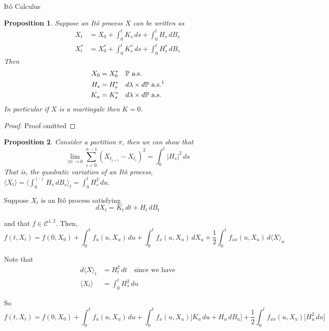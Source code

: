 \documentclass[12pt]{article}
\newenvironment{theorem}[2][Theorem:]{\begin{trivlist} %
\item[\hskip \labelsep {\bfseries #1}\hskip \labelsep {\bfseries #2.}]}{\end{trivlist}}
\newtheorem{proposition}{Proposition}
\begin{document}
\begin{section}{It\^{o} Calculus}
\begin{proposition} Suppose an It\^{o} process $X$ can be written as
	\begin{align*}
		X_t &= X_0 + \int^t_0 K_s\,ds + \int^t_0 H_s\,dB_s \\
		X_t^* &= X_0^* + \int^t_0 K_s^*\,ds + \int^t_0 H_s^*\,dB_s
	\end{align*}
Then
	\begin{align*}
		X_0 &= X_0^* \quad \text{$\mathbb P$ a.s.} \\
		H_s &= H_s^* \quad \text{$d\lambda\times d\mathbb P$ a.s.\footnotemark} \\
		K_u &= K_s^* \quad \text{$d\lambda\times d\mathbb P$ a.s.}
	\end{align*}
 In particular if $X$ is a martingale then $K = 0$.
\end{proposition}
\begin{proof} Proof omitted
\end{proof}

\begin{proposition} Consider a partition $\pi$, then we can show that
\begin{equation*}
	\lim_{|\pi|\to0} \sum^{n-1}_{i=0}(X_{t_{i+1}} - X_{t_i})^2 = \int^t_0 |H_s|^2\,ds
\end{equation*}
That is, the quadratic variation of an It\^{o} process, $\langle X_t\rangle = \langle\int^{(\cdot)}_0 H_s\,dB_s\rangle_t = \int^t_0 H^2_s\,du$.
\end{proposition}

\begin{theorem}{Existence} Suppose $X_t$ is an It\^{o} process satisfying
\begin{equation*}
	dX_t = K_t\,dt + H_t\,dB_t
\end{equation*}

and that $f \in \mathcal C^{1,2}$. Then,
\begin{equation*}
	f(t,X_t) = f(0,X_0) + \int^t_0f_u(u,X_u)\,du + \int^t_0 f_x(u,X_u)\,dX_u + \frac{1}{2} \int^t_0 f_{xx}(u,X_u)\,d\langle X\rangle_u 
\end{equation*}

Note that 
\begin{align*}
	d\langle X\rangle_t &= H^2_t\,dt \quad \text{since we have} \\
	\langle X_t\rangle &= \int^t_0 H^2_s\,du
\end{align*}

So
\begin{equation*}
	f(t,X_t) = f(0,X_0) + \int^t_0f_u(u,X_u)\,du  + \int^t_0 f_x(u,X_u)\big[K_u\,du + H_u\,dB_u\big] + \frac{1}{2}\int^t_0 f_{xx}(u,X_u)\big[H^2_u\,du\big]
\end{equation*}


\end{theorem}
\end{section}
\end{document}
